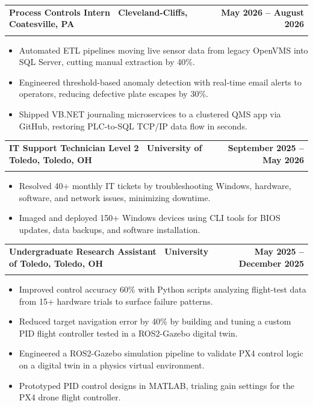 \documentclass[letterpaper,11pt]{article}
\makeatletter
\newcommand{\resumeItem}[1]{\item\small{#1 \vspace{-4pt}}}
\newcommand{\resumeSubheading}[4]{
    \vspace{-2pt}\item
    \begin{tabular*}{1.0\textwidth}[t]{l@{\extracolsep{\fill}}r}
        \textbf{#1} & \textbf{\small #2} \\
        \textit{\small#3} & \textit{\small #4}
    \end{tabular*}\vspace{-7pt}
}
\newcommand{\resumeItemListStart}{\begin{itemize}}
\newcommand{\resumeItemListEnd}{\end{itemize}\vspace{-7pt}}
\makeatother
\begin{document}
\resumeSubheading
{\textbf{Process Controls Intern} \textnormal{\textbar\ Cleveland-Cliffs, Coatesville, PA}}{May 2026 -- August 2026}
{}{}
\vspace{-0.6cm}
\resumeItemListStart

\resumeItem{Automated ETL pipelines moving live sensor data from legacy OpenVMS into SQL Server, cutting manual extraction by 40\%.}

\vspace{0.15cm}

\resumeItem{Engineered threshold-based anomaly detection with real-time email alerts to operators, reducing defective plate escapes by 30\%.}
\vspace{0.15cm}


\resumeItem{Shipped VB.NET journaling microservices to a clustered QMS app via GitHub, restoring PLC-to-SQL TCP/IP data flow in seconds.}





\vspace{0.15cm}
\resumeItemListEnd
\resumeSubheading
{\textbf{IT Support Technician Level 2} \textnormal{\textbar\ University of Toledo, Toledo, OH}}{September 2025 -- May 2026}
{}{}
\vspace{-0.6cm}
\resumeItemListStart

\resumeItem{Resolved 40+ monthly IT tickets by troubleshooting Windows, hardware, software, and network issues, minimizing downtime.}

\vspace{0.15cm}
\resumeItem{Imaged and deployed 150+ Windows devices using CLI tools for BIOS updates, data backups, and software installation.}

\vspace{0.15cm}

\resumeItemListEnd

\resumeSubheading
{\textbf{Undergraduate Research Assistant} \textnormal{\textbar\ University of Toledo, Toledo, OH}}{May 2025 -- December 2025}
{}{}
\vspace{-0.6cm}
\resumeItemListStart
\resumeItem{Improved control accuracy 60\% with Python scripts analyzing flight-test data from 15+ hardware trials to surface failure patterns.}
\vspace{0.15cm}
\resumeItem{Reduced target navigation error by 40\% by building and tuning a custom PID flight controller tested in a ROS2-Gazebo digital twin.}
\vspace{0.15cm} 
\resumeItem{Engineered a ROS2-Gazebo simulation pipeline to validate PX4 control logic on a digital twin in a physics virtual environment.}
\vspace{0.15cm}
\resumeItem{Prototyped PID control designs in MATLAB, trialing gain settings for the PX4 drone flight controller.}
\resumeItemListEnd
\end{document}
